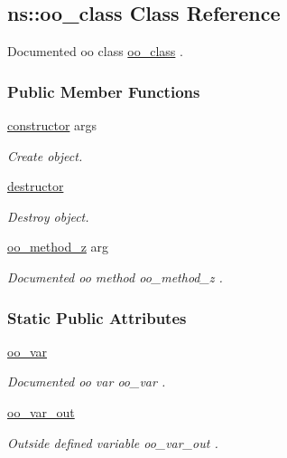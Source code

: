 \hypertarget{classns_1_1oo__class}{}\subsection{ns\+:\+:oo\+\_\+class Class Reference}
\label{classns_1_1oo__class}


Documented oo class {\ttfamily \hyperlink{classns_1_1oo__class}{oo\+\_\+class}} .  


\subsubsection*{Public Member Functions}
\begin{DoxyCompactItemize}
\item 
\hyperlink{classns_1_1oo__class_aa26b64151d4b4b0e8b4977aae7048f9b}{constructor} args
\begin{DoxyCompactList}\small\item\em Create object. \end{DoxyCompactList}\item 
\hyperlink{classns_1_1oo__class_af148cfc1c090a05986c68ac9452a510a}{destructor}
\begin{DoxyCompactList}\small\item\em Destroy object. \end{DoxyCompactList}\item 
\hyperlink{classns_1_1oo__class_a8a3cfbae3b3fca463f08adb9174a5fe8}{oo\+\_\+method\+\_\+z} arg
\begin{DoxyCompactList}\small\item\em Documented oo method {\ttfamily oo\+\_\+method\+\_\+z} . \end{DoxyCompactList}\end{DoxyCompactItemize}
\subsubsection*{Static Public Attributes}
\begin{DoxyCompactItemize}
\item 
\hyperlink{classns_1_1oo__class_a741f11f4a2db3876205658d4a9a279ba}{oo\+\_\+var}
\begin{DoxyCompactList}\small\item\em Documented oo var {\ttfamily oo\+\_\+var} . \end{DoxyCompactList}\item 
\hyperlink{classns_1_1oo__class_af46293ede16067c38ca2901416cad8ee}{oo\+\_\+var\+\_\+out}
\begin{DoxyCompactList}\small\item\em Outside defined variable {\ttfamily oo\+\_\+var\+\_\+out} . \end{DoxyCompactList}\end{DoxyCompactItemize}
